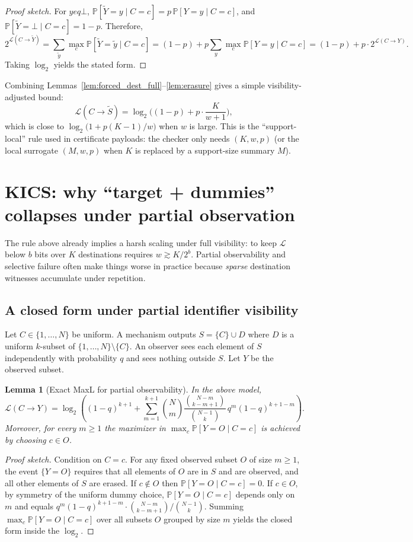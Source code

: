 \documentclass[11pt]{article}
\newcommand{\Prb}{\mathbb{P}}
\newcommand{\MaxL}{\mathcal{L}}
\newcommand{\logtwo}{\log_2}
\newtheorem{lemma}{Lemma}
\begin{document}
\begin{proof}[Proof sketch]
For $yeq\bot$, $\Prb[\tilde Y=y\mid C=c]=p\,\Prb[Y=y\mid C=c]$, and $\Prb[\tilde Y=\bot\mid C=c]=1-p$. Therefore,
\[
2^{\MaxL(C\to \tilde Y)}=\sum_{\tilde y}\max_c \Prb[\tilde Y=\tilde y\mid C=c]
=(1-p)+p\sum_{y}\max_c \Prb[Y=y\mid C=c]
=(1-p)+p\cdot 2^{\MaxL(C\to Y)}.
\]
Taking $\logtwo$ yields the stated form.
\end{proof}

Combining Lemmas~\ref{lem:forced_dest_full}--\ref{lem:erasure} gives a simple visibility-adjusted bound:
\[
\MaxL(C\!\to\!\tilde S)=\logtwo\!\Big((1-p)+p\cdot \frac{K}{w+1}\Big),
\]
which is close to $\logtwo\!\big(1+p(K-1)/w\big)$ when $w$ is large.
This is the ``support-local'' rule used in certificate payloads: the checker only needs $(K,w,p)$ (or the local surrogate $(M,w,p)$ when $K$ is replaced by a support-size summary $M$).

\section{KICS: why ``target + dummies'' collapses under partial observation}\label{sec:kics}
The rule above already implies a harsh scaling under full visibility: to keep $\MaxL$ below $b$ bits over $K$ destinations requires $w \gtrsim K/2^b$.
Partial observability and selective failure often make things worse in practice because \emph{sparse} destination witnesses accumulate under repetition.

\subsection{A closed form under partial identifier visibility}
Let $C\in\{1,\dots,N\}$ be uniform.
A mechanism outputs $S=\{C\}\cup D$ where $D$ is a uniform $k$-subset of $\{1,\dots,N\}\setminus\{C\}$.
An observer sees each element of $S$ independently with probability $q$ and sees nothing outside $S$.
Let $Y$ be the observed subset.

\begin{lemma}[Exact MaxL for partial observability]\label{lem:kics-partial-obs}
In the above model,
\[
\MaxL(C\!\to\!Y)
= \logtwo\!\left(
(1-q)^{k+1} + \sum_{m=1}^{k+1} \binom{N}{m}\frac{\binom{N-m}{k-m+1}}{\binom{N-1}{k}}\, q^{m}(1-q)^{k+1-m}
\right).
\]
Moreover, for every $m\ge 1$ the maximizer in $\max_c \Prb[Y=O\mid C=c]$ is achieved by choosing $c\in O$.
\end{lemma}
\begin{proof}[Proof sketch]
Condition on $C=c$.
For any fixed observed subset $O$ of size $m\ge 1$, the event $\{Y=O\}$ requires that all elements of $O$ are in $S$ and are observed, and all other elements of $S$ are erased.
If $c\notin O$ then $\Prb[Y=O\mid C=c]=0$.
If $c\in O$, by symmetry of the uniform dummy choice, $\Prb[Y=O\mid C=c]$ depends only on $m$ and equals
$q^{m}(1-q)^{k+1-m}\cdot \binom{N-m}{k-m+1}/\binom{N-1}{k}$.
Summing $\max_c \Prb[Y=O\mid C=c]$ over all subsets $O$ grouped by size $m$ yields the closed form inside the $\logtwo$.
\end{proof}
\end{document}
